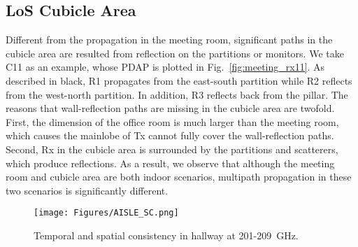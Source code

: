 \documentclass[journal,12pt,draftclsnofoot,onecolumn]{IEEEtran}
\begin{document}
\subsection{LoS Cubicle Area}
Different from the propagation in the meeting room, significant paths in the cubicle area are resulted from reflection on the partitions or monitors. We take C11 as an example, whose PDAP is plotted in Fig.~\ref{fig:meeting_rx11}. As described in black, R1 propagates from the east-south partition while R2 reflects from the west-north partition. In addition, R3 reflects back from the pillar. The reasons that wall-reflection paths are missing in the cubicle area are twofold. First, the dimension of the office room is much larger than the meeting room, which causes the mainlobe of Tx cannot fully cover the wall-reflection paths. Second, Rx in the cubicle area is surrounded by the partitions and scatterers, which produce reflections. As a result, we observe that although the meeting room and cubicle area are both indoor scenarios, multipath propagation in these two scenarios is significantly different.

\begin{figure}
\centering
\texttt{[image: Figures/AISLE\_SC.png]}
\caption{Temporal and spatial consistency in hallway at 201-209~GHz.}
\label{fig:sc_hallway}
\end{figure}
\end{document}
